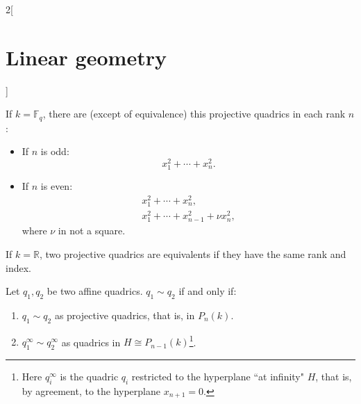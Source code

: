 \documentclass[../../../main.tex]{subfiles}
\begin{document}
\begin{multicols}{2}[\section{Linear geometry}]
\begin{theorem}
If $k=\mathbb{F}_q$, there are (except of equivalence) this projective quadrics in each rank $n$:
\begin{itemize}
    \item If $n$ is odd: $$\displaystyle x_1^2+\cdots+ x_n^2.$$
    \item If $n$ is even: \begin{gather*}
    x_1^2+\cdots+ x_n^2,\\
    x_1^2+\cdots+ x_{n-1}^2+\nu x_n^2,
\end{gather*}
where $\nu$ in not a square.
\end{itemize}
\end{theorem}
\begin{theorem}
If $k=\mathbb{R}$, two projective quadrics are equivalents if they have the same rank and index.
\end{theorem}
\begin{theorem}
Let $q_1,q_2$ be two affine quadrics. $q_1\sim q_2$ if and only if:
\begin{enumerate}
    \item $q_1\sim q_2$ as projective quadrics, that is, in $P_n(k)$.
    \item $q_1^\infty\sim q_2^\infty$ as quadrics in $H\cong P_{n-1}(k)$\footnote{Here $q_i^\infty$ is the quadric $q_i$ restricted to the hyperplane ``at infinity" $H$, that is, by agreement, to the hyperplane $x_{n+1}=0$.}.
\end{enumerate}
\end{theorem}
\end{multicols}
\end{document}
